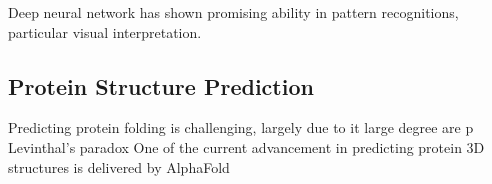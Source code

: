 Deep neural network has shown promising ability in pattern recognitions, particular visual interpretation.
\par 

\subsection{Protein Structure Prediction}
Predicting protein folding is challenging, largely due to it large degree are p Levinthal's paradox One of the current advancement in predicting protein 3D structures is delivered by AlphaFold